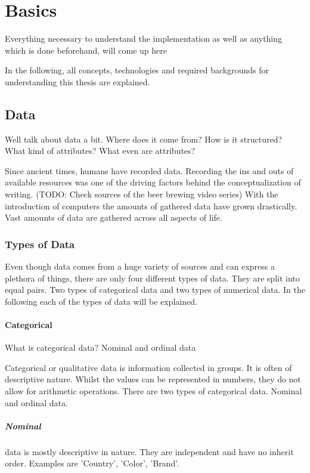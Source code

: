\chapter{Basics}
Everything necessary to understand the implementation as well as anything which is done beforehand, will come up here

In the following, all concepts, technologies and required backgrounds for understanding this thesis are explained. 


\section{Data}
Well talk about data a bit. Where does it come from? How is it structured? What kind of attributes? What even are attributes?

Since ancient times, humans have recorded data. Recording the ins and outs of available resources was one of the driving factors behind the conceptualization of writing. (TODO: Check sources of the beer brewing video series)
With the introduction of computers the amounts of gathered data have grown drastically. Vast amounts of data are gathered across all aspects of life.

\subsection{Types of Data}
Even though data comes from a huge variety of sources and can express a plethora of things, there are only four different types of data. They are split into equal pairs. Two types of categorical data and two types of numerical data. In the following each of the types of data will be explained.

\subsubsection{Categorical}
What is categorical data? Nominal and ordinal data

Categorical or qualitative data is information collected in groups. It is often of descriptive nature. Whilst the values can be represented in numbers, they do not allow for arithmetic operations.
There are two types of categorical data. Nominal and ordinal data.

\paragraph{Nominal}
data is mostly descriptive in nature. They are independent and have no inherit order. Examples are 'Country', 'Color', 'Brand'.

